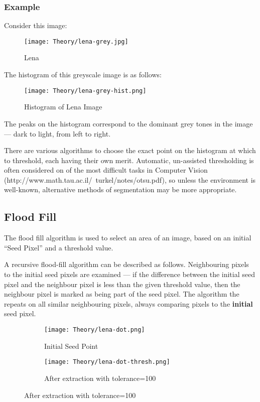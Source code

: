 \subsubsection{Example}
Consider this image:

\begin{figure}
    \centering
    \texttt{[image: Theory/lena-grey.jpg]}
    \caption{Lena}
\end{figure}

The histogram of this greyscale image is as follows:

\begin{figure}
    \centering
    \texttt{[image: Theory/lena-grey-hist.png]}
    \caption{Histogram of Lena Image}
\end{figure}

The peaks on the histogram correspond to the dominant grey tones in the image --- dark to light, from left to right.

There are various algorithms to choose the exact point on the histogram at which to threshold, each having their own merit. Automatic, un-assisted thresholding is often considered on of the most difficult tasks in Computer Vision (http://www.math.tau.ac.il/~turkel/notes/otsu.pdf), so unless the environment is well-known, alternative methods of segmentation may be more appropriate.

\subsection{Flood Fill}
\label{sec:floodfill}
The flood fill algorithm is used to select an area of an image, based on an initial ``Seed Pixel'' and a threshold value.

A recursive flood-fill algorithm can be described as follows. Neighbouring pixels to the initial seed pixels are examined --- if the difference between the initial seed pixel and the neighbour pixel is less than the given threshold value, then the neighbour pixel is marked as being part of the seed pixel. The algorithm the repeats on all similar neighbouring pixels, always comparing pixels to the \textbf{initial} seed pixel.

\begin{figure}
    \centering
    \begin{subfigure}[b]{0.45\textwidth}
        \centering
        \texttt{[image: Theory/lena-dot.png]}
        \caption{Initial Seed Point}
    \end{subfigure}
    \begin{subfigure}[b]{0.45\textwidth}
        \centering
        \texttt{[image: Theory/lena-dot-thresh.png]}
        \caption{After extraction with tolerance=100}
    \end{subfigure}
\end{figure}

